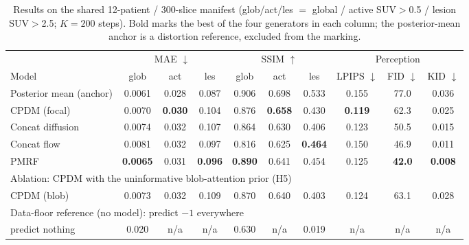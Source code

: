 \documentclass[11pt,a4paper]{article}
\newcommand{\num}[1]{#1}
\begin{document}
\begin{table}[h]\centering\small\setlength{\tabcolsep}{4pt}
\caption[Results on the shared 12-patient / 300-slice manifest]{Results on the shared
\num{12}-patient / \num{300}-slice manifest (glob/act/les $=$ global / active SUV$>$0.5 /
lesion SUV$>$2.5; $K{=}200$ steps). Bold marks the best of the four generators in each column;
the posterior-mean anchor is a distortion reference, excluded from the marking.}
\label{tab:results}
\begin{tabular}{l ccc ccc ccc}
\toprule
& \multicolumn{3}{c}{MAE $\downarrow$} & \multicolumn{3}{c}{SSIM $\uparrow$} & \multicolumn{3}{c}{Perception} \\
\cmidrule(lr){2-4}\cmidrule(lr){5-7}\cmidrule(lr){8-10}
Model & glob & act & les & glob & act & les & LPIPS $\downarrow$ & FID $\downarrow$ & KID $\downarrow$ \\
\midrule
Posterior mean (anchor) & \num{0.0061} & \num{0.028} & \num{0.087} & \num{0.906} & \num{0.698} & \num{0.533} & \num{0.155} & \num{77.0} & \num{0.036} \\
\midrule
CPDM (focal)             & \num{0.0070} & \textbf{\num{0.030}} & \num{0.104} & \num{0.876} & \textbf{\num{0.658}} & \num{0.430} & \textbf{\num{0.119}} & \num{62.3} & \num{0.025} \\
Concat diffusion         & \num{0.0074} & \num{0.032} & \num{0.107} & \num{0.864} & \num{0.630} & \num{0.406} & \num{0.123} & \num{50.5} & \num{0.015} \\
Concat flow              & \num{0.0081} & \num{0.032} & \num{0.097} & \num{0.816} & \num{0.625} & \textbf{\num{0.464}} & \num{0.150} & \num{46.9} & \num{0.011} \\
PMRF                     & \textbf{\num{0.0065}} & \num{0.031} & \textbf{\num{0.096}} & \textbf{\num{0.890}} & \num{0.641} & \num{0.454} & \num{0.125} & \textbf{\num{42.0}} & \textbf{\num{0.008}} \\
\midrule
\multicolumn{10}{l}{Ablation: CPDM with the uninformative blob-attention prior (H5)}\\
CPDM (blob)              & \num{0.0073} & \num{0.032} & \num{0.109} & \num{0.870} & \num{0.640} & \num{0.403} & \num{0.124} & \num{63.1} & \num{0.028} \\
\midrule
\multicolumn{10}{l}{Data-floor reference (no model): predict $-1$ everywhere}\\
predict nothing & \num{0.020} & n/a & n/a & \num{0.630} & n/a & \num{0.019} & n/a & n/a & n/a \\
\bottomrule
\end{tabular}
\end{table}
\end{document}
